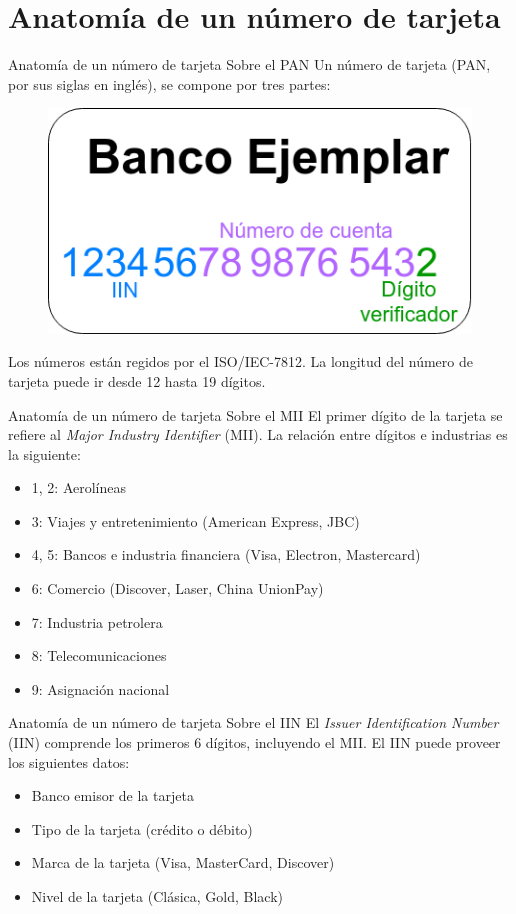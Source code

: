 %
%

\section{Anatomía de un número de tarjeta}

\begin{frame}{Anatomía de un número de tarjeta}
  {Sobre el PAN}
  Un número de tarjeta (PAN, por sus siglas en inglés), se compone por tres
  partes:
  \begin{figure}[H]
    \begin{center}
      \includegraphics[width=0.5\linewidth]{diagramas/tarjeta.png}
    \end{center}
  \end{figure}

  Los números están regidos por el ISO/IEC-7812.
  La longitud del número de tarjeta puede ir desde 12 hasta 19 dígitos.
\end{frame}

\begin{frame}{Anatomía de un número de tarjeta}
  {Sobre el MII}
  El primer dígito de la tarjeta se refiere al
  \textit{Major Industry Identifier} (MII). La relación entre dígitos e
  industrias es la siguiente:
  \begin{itemize}
    \item 1, 2: Aerolíneas
    \item 3: Viajes y entretenimiento (American Express, JBC)
    \item 4, 5: Bancos e industria financiera (Visa, Electron, Mastercard)
    \item 6: Comercio (Discover, Laser, China UnionPay)
    \item 7: Industria petrolera
    \item 8: Telecomunicaciones
    \item 9: Asignación nacional
  \end{itemize}
\end{frame}

\begin{frame}{Anatomía de un número de tarjeta}
  {Sobre el IIN}
  El \textit{Issuer Identification Number} (IIN) comprende los primeros
  6 dígitos, incluyendo el MII. El IIN puede proveer los siguientes datos:
  \begin{itemize}
    \item Banco emisor de la tarjeta
    \item Tipo de la tarjeta (crédito o débito)
    \item Marca de la tarjeta (Visa, MasterCard, Discover)
    \item Nivel de la tarjeta (Clásica, Gold, Black)
  \end{itemize}
\end{frame}


